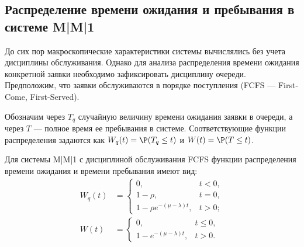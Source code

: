 \subsection*{Распределение времени ожидания и пребывания в системе M|M|1}

До сих пор макроскопические характеристики системы вычислялись без учета дисциплины обслуживания. Однако для анализа распределения времени ожидания конкретной заявки необходимо зафиксировать дисциплину очереди. Предположим, что заявки обслуживаются в порядке поступления (FCFS — First-Come, First-Served). 

Обозначим через $T_q$ случайную величину времени ожидания заявки в очереди, а через $T$ — полное время ее пребывания в системе. Соответствующие функции распределения задаются как $W_q(t) = \P(T_q \le t)$ и $W(t) = \P(T \le t)$.

\begin{statement}
Для системы M|M|1 с дисциплиной обслуживания FCFS функции распределения времени ожидания и времени пребывания имеют вид:
\begin{align*}
    W_q(t) &= \begin{cases}
        0, & t < 0, \\
        1 - \rho, & t = 0, \\
        1 - \rho e^{-(\mu - \lambda)t}, & t > 0;
    \end{cases} \\[2mm]
    W(t) &= \begin{cases}
        0, & t \le 0, \\
        1 - e^{-(\mu - \lambda)t}, & t > 0.
    \end{cases}
\end{align*}
\end{statement}

